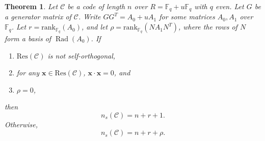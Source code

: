 \documentclass{article}
\newtheorem{theorem}{Theorem}[section]
\theoremstyle{definition}
\theoremstyle{remark}
\begin{document}
\begin{theorem}\label{thm:exact_even}
Let $\mathcal C$ be a code of length $n$ over $R=\mathbb{F}_q+u\mathbb{F}_q$ with $q$ even. Let $G$ be a generator matrix of $\mathcal{C}$. Write $GG^T=A_0+uA_1$ for some matrices $A_0, A_1$ over $\mathbb{F}_q$. Let $r=\mathrm{rank}_{\mathbb{F}_q}(A_0)$, and let $\rho=\mathrm{rank}_{\mathbb{F}_q}(NA_1N^T)$, where the rows of $N$ form a basis of $\operatorname{Rad}(A_0)$. If
\begin{enumerate}
    \item[(i)] $\mathrm{Res}(\mathcal{C})$ is not self-orthogonal,
    \item[(ii)] for any $\mathbf{x}\in \mathrm{Res}(\mathcal{C})$, $\mathbf{x}\cdot \mathbf{x}=0$, and
    \item[(iii)] $\rho=0$,
\end{enumerate}
then
\[
n_s(\mathcal{C})=n+r+1.
\]
Otherwise,
\[
n_s(\mathcal{C})=n+r+\rho.
\]
\end{theorem}
\end{document}

